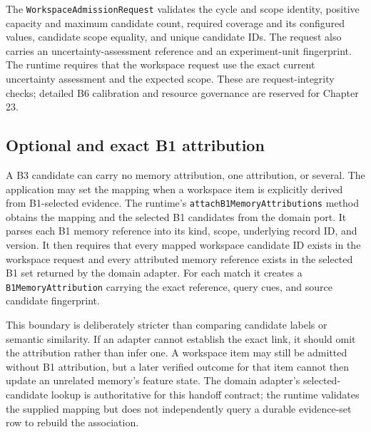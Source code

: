 The \texttt{Workspace\allowbreak{}Admission\allowbreak{}Request} validates the cycle and scope identity, positive capacity and maximum candidate count, required coverage and its configured values, candidate scope equality, and unique candidate IDs. The request also carries an uncertainty-assessment reference and an experiment-unit fingerprint. The runtime requires that the workspace request use the exact current uncertainty assessment and the expected scope. These are request-integrity checks; detailed B6 calibration and resource governance are reserved for Chapter 23.

\subsection{Optional and exact B1 attribution}
\label{subsec:ch21-b3-attribution}

A B3 candidate can carry no memory attribution, one attribution, or several. The application may set the mapping when a workspace item is explicitly derived from B1-selected evidence. The runtime's \texttt{attach\allowbreak{}B1\allowbreak{}Memory\allowbreak{}Attributions} method obtains the mapping and the selected B1 candidates from the domain port. It parses each B1 memory reference into its kind, scope, underlying record ID, and version. It then requires that every mapped workspace candidate ID exists in the workspace request and every attributed memory reference exists in the selected B1 set returned by the domain adapter. For each match it creates a \texttt{B1MemoryAttribution} carrying the exact reference, query cues, and source candidate fingerprint.

This boundary is deliberately stricter than comparing candidate labels or semantic similarity. If an adapter cannot establish the exact link, it should omit the attribution rather than infer one. A workspace item may still be admitted without B1 attribution, but a later verified outcome for that item cannot then update an unrelated memory's feature state. The domain adapter's selected-candidate lookup is authoritative for this handoff contract; the runtime validates the supplied mapping but does not independently query a durable evidence-set row to rebuild the association.

